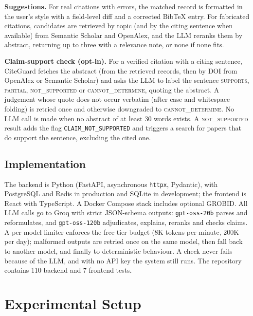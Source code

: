 \documentclass[10pt,twocolumn,a4paper]{article}
\newcommand{\cg}{CiteGuard}
\newcommand{\code}[1]{\texttt{\small #1}}
\begin{document}
\textbf{Suggestions.} For real citations with errors, the matched record is formatted in the user's
style with a field-level diff and a corrected BibTeX entry. For fabricated citations, candidates are
retrieved by topic (and by the citing sentence when available) from Semantic Scholar and OpenAlex,
and the LLM reranks them by abstract, returning up to three with a relevance note, or none if none
fits.

\textbf{Claim-support check (opt-in).} For a verified citation with a citing sentence, \cg{} fetches
the abstract (from the retrieved records, then by DOI from OpenAlex or Semantic Scholar) and asks the
LLM to label the sentence \textsc{supports}, \textsc{partial}, \textsc{not\_supported} or
\textsc{cannot\_determine}, quoting the abstract. A judgement whose quote does not occur verbatim (after
case and whitespace folding) is retried once and otherwise downgraded to \textsc{cannot\_determine}.
No LLM call is made when no abstract of at least 30 words exists. A \textsc{not\_supported} result
adds the flag \code{CLAIM\_NOT\_SUPPORTED} and triggers a search for papers that do support the
sentence, excluding the cited one.

\subsection{Implementation}
The backend is Python (FastAPI, asynchronous \texttt{httpx}, Pydantic), with PostgreSQL and Redis
in production and SQLite in development; the frontend is React with TypeScript. A Docker Compose
stack includes optional GROBID. All LLM calls go to Groq with strict JSON-schema outputs:
\texttt{gpt-oss-20b} \citep{openai2025gptoss} parses and reformulates, and \texttt{gpt-oss-120b}
adjudicates, explains, reranks and checks claims. A per-model limiter enforces the free-tier budget
(8K tokens per minute, 200K per day); malformed outputs are retried once on the same model, then
fall back to another model, and finally to deterministic behaviour. A check never fails because of
the LLM, and with no API key the system still runs. The repository contains 110 backend and 7
frontend tests.

\section{Experimental Setup}
\label{sec:setup}
\end{document}
